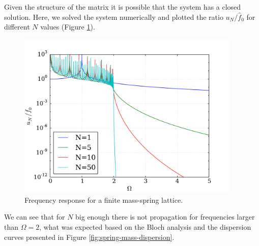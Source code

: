 \documentclass[12pt,letterpaper]{article}
\begin{document}
Given the structure of the matrix it is possible that the system has a closed solution. Here, we solved the system numerically and plotted the ratio $u_N/\hat{f}_0$ for different $N$ values (Figure \ref{fig:single-finite}).
\begin{figure}[h]
\centering
\includegraphics[height=8cm]{img/single_finite.pdf} 
\caption{Frequency response for a finite mass-spring lattice.}\label{fig:single-finite}
\end{figure}

We can see that for $N$ big enough there is not propagation for frequencies larger than $\Omega=2$, what was expected based on the Bloch analysis and the dispersion curves presented in Figure \ref{fig:spring-mass-dispersion}.


\end{document}
